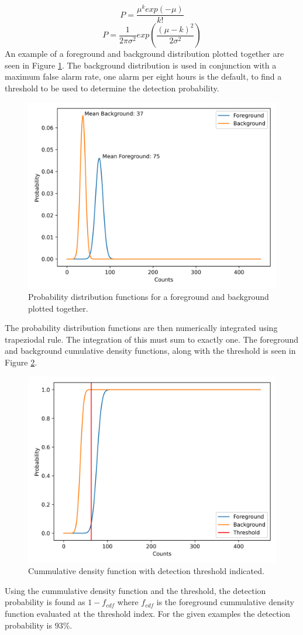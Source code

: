 	\begin{equation}
		P=\frac{\mu^kexp\left(-\mu\right)}{k!}
		\label{eq:poisson}
	\end{equation}
	\begin{equation}
		P=\frac{1}{2\pi\sigma^2}exp\left(\frac{\left(\mu-k\right)^2}{2\sigma^2}\right)
		\label{eq:gaussian}
		\end{equation}
	An example of a foreground and background distribution plotted together are seen in Figure \ref{fig:pdf}. The background distribution is used in conjunction with a maximum false alarm rate, one alarm per eight hours is the default, to find a threshold to be used to determine the detection probability. \\
	
	\begin{figure}[h!]
		\centering
		\includegraphics[width=0.6\linewidth]{pdf.png}
		\caption{Probability distribution functions for a foreground and background plotted together.}
		\label{fig:pdf}
	\end{figure}
	The probability distribution functions are then numerically integrated using trapeziodal rule. The integration of this must sum to exactly one. The foreground and background cumulative density functions, along with the threshold is seen in Figure \ref{fig:cdf}.\\
	\begin{figure}[h!]
		\centering
		\includegraphics[width=0.6\linewidth]{cdf.png}
		\caption{Cummulative density function with detection threshold indicated.}
		\label{fig:cdf}
	\end{figure}
Using the cummulative density function and the threshold, the detection probability is found as $1-f_{cdf}$ where $f_{cdf}$ is the foreground cummulative density function evaluated at the threshold index. For the given examples the detection probability is 93\%. 
